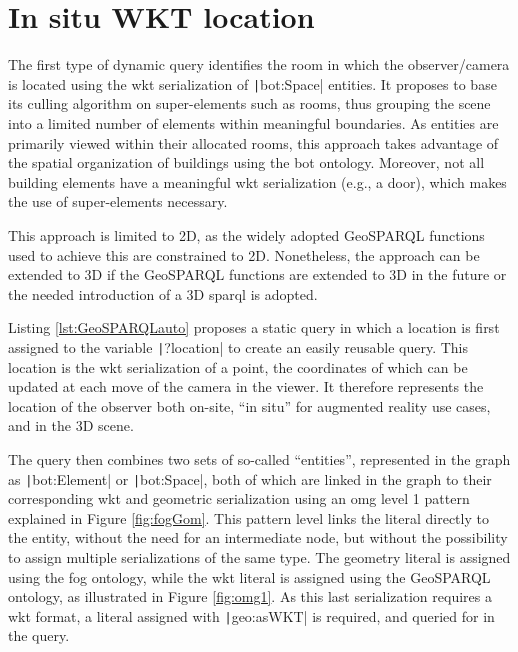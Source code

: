 \section{In situ WKT location}
The first type of dynamic query identifies the room in which the observer/camera is located using the \ac{wkt} serialization of \texttt|bot:Space| entities. It proposes to base its culling algorithm on super-elements such as rooms, thus grouping the scene into a limited number of elements within meaningful boundaries. As entities are primarily viewed within their allocated rooms, this approach takes advantage of the spatial organization of buildings using the \ac{bot} ontology. Moreover, not all building elements have a meaningful \ac{wkt} serialization (e.g., a door), which makes the use of super-elements necessary.

This approach is limited to 2D, as the widely adopted GeoSPARQL functions used to achieve this are constrained to 2D. Nonetheless, the approach can be extended to 3D if the GeoSPARQL functions are extended to 3D in the future or the needed introduction of a 3D \ac{sparql} is adopted.

Listing \ref{lst:GeoSPARQLauto} proposes a static query in which a location is first assigned to the variable \texttt|?location| to create an easily reusable query. This location is the \ac{wkt} serialization of a point, the coordinates of which can be updated at each move of the camera in the viewer. It therefore represents the location of the observer both on-site, \enquote{in situ} for augmented reality use cases, and in the 3D scene.

The query then combines two sets of so-called \enquote{entities}, represented in the graph as \texttt|bot:Element| or \texttt|bot:Space|, both of which are linked in the graph to their corresponding \ac{wkt} and geometric serialization using an \ac{omg} level 1 pattern explained in Figure \ref{fig:fogGom}. This pattern level links the literal directly to the entity, without the need for an intermediate node, but without the possibility to assign multiple serializations of the same type. The geometry literal is assigned using the \ac{fog} ontology, while the \ac{wkt} literal is assigned using the GeoSPARQL ontology, as illustrated in Figure \ref{fig:omg1}. As this last serialization requires a \ac{wkt} format, a literal assigned with \texttt|geo:asWKT| is required, and queried for in the query.

